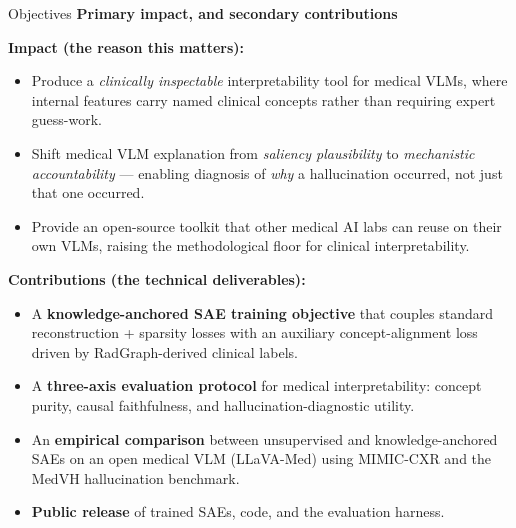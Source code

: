 \documentclass[aspectratio=169,11pt]{beamer}
\begin{document}
\begin{frame}{Objectives}
    \textbf{Primary impact, and secondary contributions}

    \vspace{0.5em}
    \textbf{Impact (the reason this matters):}
    \begin{itemize}
        \item Produce a \emph{clinically inspectable} interpretability tool for medical VLMs, where internal features carry named clinical concepts rather than requiring expert guess-work.
        \item Shift medical VLM explanation from \emph{saliency plausibility} to \emph{mechanistic accountability} --- enabling diagnosis of \textit{why} a hallucination occurred, not just that one occurred.
        \item Provide an open-source toolkit that other medical AI labs can reuse on their own VLMs, raising the methodological floor for clinical interpretability.
    \end{itemize}

    \vspace{0.5em}
    \textbf{Contributions (the technical deliverables):}
    \begin{itemize}
        \item A \textbf{knowledge-anchored SAE training objective} that couples standard reconstruction + sparsity losses with an auxiliary concept-alignment loss driven by RadGraph-derived clinical labels.
        \item A \textbf{three-axis evaluation protocol} for medical interpretability: concept purity, causal faithfulness, and hallucination-diagnostic utility.
        \item An \textbf{empirical comparison} between unsupervised and knowledge-anchored SAEs on an open medical VLM (LLaVA-Med) using MIMIC-CXR and the MedVH hallucination benchmark.
        \item \textbf{Public release} of trained SAEs, code, and the evaluation harness.
    \end{itemize}
\end{frame}
\end{document}
